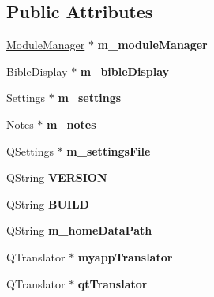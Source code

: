 \subsection*{Public Attributes}
\begin{DoxyCompactItemize}
\item 
\hypertarget{classMainWindow_ad0cd93fa38bb5ec71d8973ac66af2615}{
\hyperlink{classModuleManager}{ModuleManager} $\ast$ {\bfseries m\_\-moduleManager}}
\label{classMainWindow_ad0cd93fa38bb5ec71d8973ac66af2615}

\item 
\hypertarget{classMainWindow_a192b3d658f9ef44b532a66ac4b375176}{
\hyperlink{classBibleDisplay}{BibleDisplay} $\ast$ {\bfseries m\_\-bibleDisplay}}
\label{classMainWindow_a192b3d658f9ef44b532a66ac4b375176}

\item 
\hypertarget{classMainWindow_ae5f31d6baa938f1fdf33694bb36501bc}{
\hyperlink{classSettings}{Settings} $\ast$ {\bfseries m\_\-settings}}
\label{classMainWindow_ae5f31d6baa938f1fdf33694bb36501bc}

\item 
\hypertarget{classMainWindow_a0a0315b93be2c938662a02e1d813cf49}{
\hyperlink{classNotes}{Notes} $\ast$ {\bfseries m\_\-notes}}
\label{classMainWindow_a0a0315b93be2c938662a02e1d813cf49}

\item 
\hypertarget{classMainWindow_a77fe7254ab86dd608773a14e47c46107}{
QSettings $\ast$ {\bfseries m\_\-settingsFile}}
\label{classMainWindow_a77fe7254ab86dd608773a14e47c46107}

\item 
\hypertarget{classMainWindow_a3a92e4812a8695f1eb366a4fcad5015a}{
QString {\bfseries VERSION}}
\label{classMainWindow_a3a92e4812a8695f1eb366a4fcad5015a}

\item 
\hypertarget{classMainWindow_a52a9752c79e2f4e23aaf8e83fdcc73f9}{
QString {\bfseries BUILD}}
\label{classMainWindow_a52a9752c79e2f4e23aaf8e83fdcc73f9}

\item 
\hypertarget{classMainWindow_abb8d42b6e667d979f29b5198fe7a1d9f}{
QString {\bfseries m\_\-homeDataPath}}
\label{classMainWindow_abb8d42b6e667d979f29b5198fe7a1d9f}

\item 
\hypertarget{classMainWindow_a9715e4f3c6516a29086cbeab4d24e4b9}{
QTranslator $\ast$ {\bfseries myappTranslator}}
\label{classMainWindow_a9715e4f3c6516a29086cbeab4d24e4b9}

\item 
\hypertarget{classMainWindow_a24d77db9a9c7cd5239866e356ccfe280}{
QTranslator $\ast$ {\bfseries qtTranslator}}
\label{classMainWindow_a24d77db9a9c7cd5239866e356ccfe280}

\end{DoxyCompactItemize}
